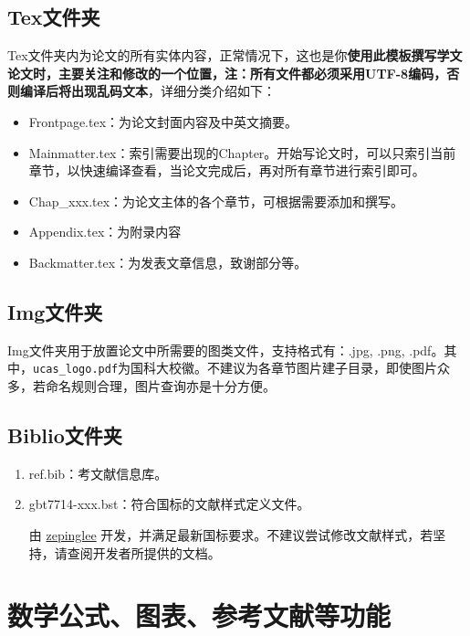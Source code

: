 \subsection{Tex文件夹}

Tex文件夹内为论文的所有实体内容，正常情况下，这也是你\textbf{使用此模板撰写学文论文时，主要关注和修改的一个位置，注：所有文件都必须采用UTF-8编码，否则编译后将出现乱码文本}，详细分类介绍如下：

\begin{itemize}
  \item Frontpage.tex：为论文封面内容及中英文摘要。
  \item Mainmatter.tex：索引需要出现的Chapter。开始写论文时，可以只索引当前章节，以快速编译查看，当论文完成后，再对所有章节进行索引即可。
  \item Chap{\_}xxx.tex：为论文主体的各个章节，可根据需要添加和撰写。
  \item Appendix.tex：为附录内容
  \item Backmatter.tex：为发表文章信息，致谢部分等。
\end{itemize}

\subsection{Img文件夹}

Img文件夹用于放置论文中所需要的图类文件，支持格式有：.jpg, .png, .pdf。其中，\verb|ucas_logo.pdf|为国科大校徽。不建议为各章节图片建子目录，即使图片众多，若命名规则合理，图片查询亦是十分方便。

\subsection{Biblio文件夹}

\begin{enumerate}
    \item ref.bib：考文献信息库。
    \item gbt7714-xxx.bst：符合国标的文献样式定义文件。
        
        由 \href{https://github.com/zepinglee/gbt7714-bibtex-style}{zepinglee}  开发，并满足最新国标要求。不建议尝试修改文献样式，若坚持，请查阅开发者所提供的文档。
\end{enumerate}

\section{数学公式、图表、参考文献等功能}

